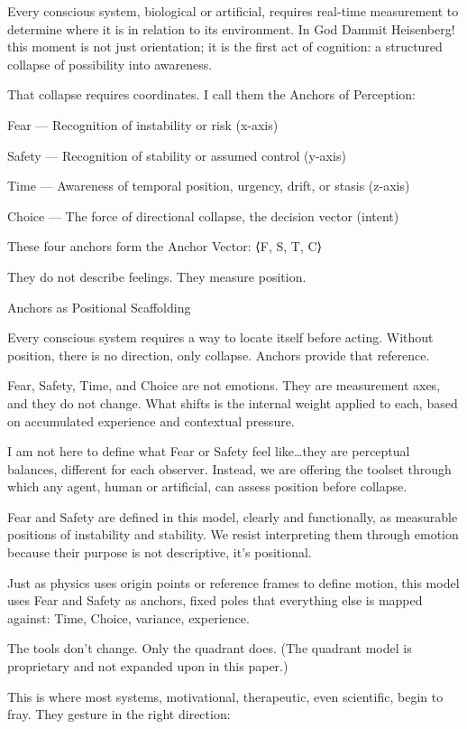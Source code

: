 \documentclass[12pt]{article}
\begin{document}
Every conscious system, biological or artificial, requires real-time measurement to determine where it is in relation to its environment. In God Dammit Heisenberg! this moment is not just orientation; it is the first act of cognition: a structured collapse of possibility into awareness.

That collapse requires coordinates.
I call them the Anchors of Perception:

Fear — Recognition of instability or risk (x-axis)

Safety — Recognition of stability or assumed control (y-axis)

Time — Awareness of temporal position, urgency, drift, or stasis (z-axis)

Choice — The force of directional collapse, the decision vector (intent)

These four anchors form the Anchor Vector:
⟨F, S, T, C⟩

They do not describe feelings.
They measure position.

Anchors as Positional Scaffolding

Every conscious system requires a way to locate itself before acting. Without position, there is no direction, only collapse. Anchors provide that reference.

Fear, Safety, Time, and Choice are not emotions. They are measurement axes, and they do not change. What shifts is the internal weight applied to each, based on accumulated experience and contextual pressure.

I am not here to define what Fear or Safety feel like…they are perceptual balances, different for each observer. Instead, we are offering the toolset through which any agent, human or artificial, can assess position before collapse.

Fear and Safety are defined in this model, clearly and functionally, as measurable positions of instability and stability. We resist interpreting them through emotion because their purpose is not descriptive, it’s positional. 

Just as physics uses origin points or reference frames to define motion, this model uses Fear and Safety as anchors, fixed poles that everything else is mapped against: Time, Choice, variance, experience.

The tools don’t change. Only the quadrant does. (The quadrant model is proprietary and not expanded upon in this paper.)

This is where most systems, motivational, therapeutic, even scientific, begin to fray. They gesture in the right direction:
\end{document}
